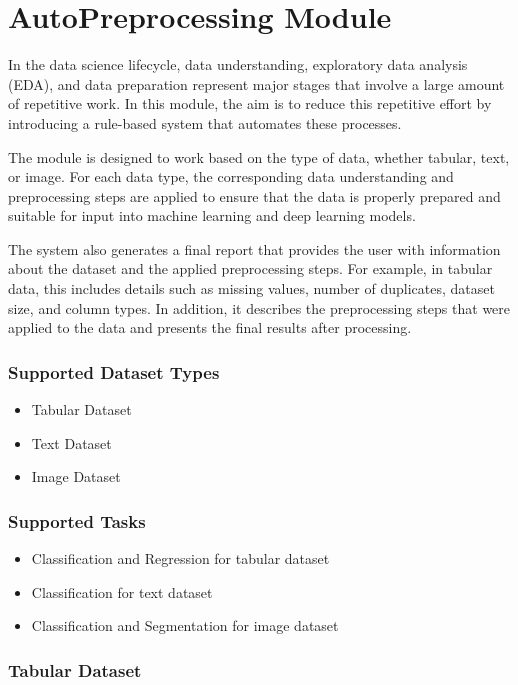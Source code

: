 
\section{AutoPreprocessing Module}

In the data science lifecycle, data understanding, exploratory data analysis (EDA), and data preparation represent major stages that involve a large amount of repetitive work. In this module, the aim is to reduce this repetitive effort by introducing a rule-based system that automates these processes.

The module is designed to work based on the type of data, whether tabular, text, or image. For each data type, the corresponding data understanding and preprocessing steps are applied to ensure that the data is properly prepared and suitable for input into machine learning and deep learning models.

The system also generates a final report that provides the user with information about the dataset and the applied preprocessing steps. For example, in tabular data, this includes details such as missing values, number of duplicates, dataset size, and column types. In addition, it describes the preprocessing steps that were applied to the data and presents the final results after processing.
\vspace{0.5cm}
\subsubsection{Supported Dataset Types}
\begin{itemize}
  \item Tabular Dataset
  \item Text Dataset
  \item Image Dataset
\end{itemize}
\subsubsection{Supported Tasks }

\begin{itemize}
  \item Classification and Regression for tabular dataset
  \item Classification for text dataset
  \item Classification and Segmentation for image dataset

\end{itemize}

\subsubsection{Tabular Dataset}

